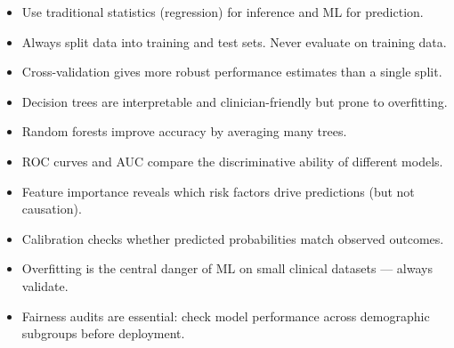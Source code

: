 \begin{itemize}
  \item Use traditional statistics (regression) for inference and ML for prediction.
  \item Always split data into training and test sets. Never evaluate on training data.
  \item Cross-validation gives more robust performance estimates than a single split.
  \item Decision trees are interpretable and clinician-friendly but prone to overfitting.
  \item Random forests improve accuracy by averaging many trees.
  \item ROC curves and AUC compare the discriminative ability of different models.
  \item Feature importance reveals which risk factors drive predictions (but not causation).
  \item Calibration checks whether predicted probabilities match observed outcomes.
  \item Overfitting is the central danger of ML on small clinical datasets --- always validate.
  \item Fairness audits are essential: check model performance across demographic subgroups before deployment.
\end{itemize}
